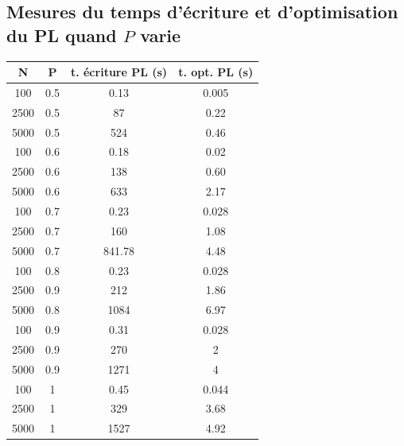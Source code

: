 \documentclass{article}
\begin{document}
\begin{appendices}
\subsection{Mesures du temps d'écriture et d'optimisation du PL quand $P$ varie}
\begin{table}[h]
    \centering
    \begin{tabular}{c|c|c|c}
    N & P & t. écriture PL (s)& t. opt. PL (s)\\ \hline
    100 & 0.5 & 0.13 & 0.005 \\
    2500 & 0.5 & 87 & 0.22 \\
    5000 & 0.5 & 524 & 0.46 \\
    100 & 0.6 & 0.18 & 0.02 \\
    2500 & 0.6 & 138 & 0.60 \\
    5000 & 0.6 & 633 & 2.17 \\
    100 & 0.7 & 0.23 & 0.028 \\
    2500 & 0.7 & 160 & 1.08 \\
    5000 & 0.7 & 841.78 & 4.48 \\
    100 & 0.8 & 0.23 & 0.028 \\
    2500 & 0.9 & 212 & 1.86 \\
    5000 & 0.8 & 1084 & 6.97 \\
    100 & 0.9 & 0.31 & 0.028 \\
    2500 & 0.9 & 270 & 2 \\
    5000 & 0.9 & 1271 & 4 \\
    100 & 1 & 0.45 & 0.044 \\
    2500 & 1 & 329 & 3.68 \\
    5000 & 1 & 1527 & 4.92
    \end{tabular}
\end{table}

\end{appendices}
\end{document}
